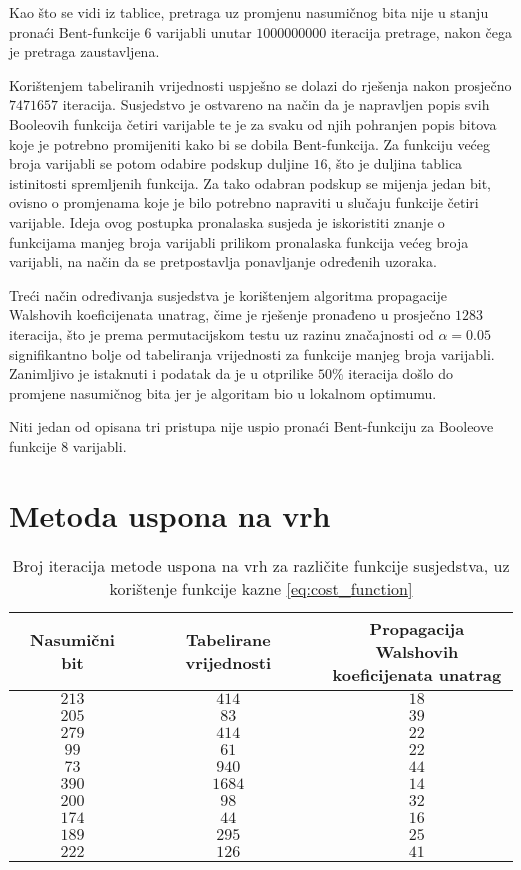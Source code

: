 Kao što se vidi iz tablice, pretraga uz promjenu nasumičnog bita nije u stanju pronaći Bent-funkcije $6$ varijabli unutar $1 000 000 000$ iteracija pretrage, nakon čega je pretraga zaustavljena.

Korištenjem tabeliranih vrijednosti uspješno se dolazi do rješenja nakon prosječno $7 471 657$ iteracija.
Susjedstvo je ostvareno na način da je napravljen popis svih Booleovih funkcija četiri varijable te je za svaku od njih pohranjen popis bitova koje je potrebno promijeniti kako bi se dobila Bent-funkcija.
Za funkciju većeg broja varijabli se potom odabire podskup duljine $16$, što je duljina tablica istinitosti spremljenih funkcija.
Za tako odabran podskup se mijenja jedan bit, ovisno o promjenama koje je bilo potrebno napraviti u slučaju funkcije četiri varijable.
Ideja ovog postupka pronalaska susjeda je iskoristiti znanje o funkcijama manjeg broja varijabli prilikom pronalaska funkcija većeg broja varijabli, na način da se pretpostavlja ponavljanje određenih uzoraka.

Treći način određivanja susjedstva je korištenjem algoritma propagacije Walshovih koeficijenata unatrag, čime je rješenje pronađeno u prosječno $1 283$ iteracija, što je prema permutacijskom testu uz razinu značajnosti od $\alpha = 0.05$ signifikantno bolje od tabeliranja vrijednosti za funkcije manjeg broja varijabli.
Zanimljivo je istaknuti i podatak da je u otprilike $50\%$ iteracija došlo do promjene nasumičnog bita jer je algoritam bio u lokalnom optimumu.

Niti jedan od opisana tri pristupa nije uspio pronaći Bent-funkciju za Booleove funkcije $8$ varijabli.

\section{Metoda uspona na vrh}
\begin{table}[]
    \centering
    \begin{tabular}{ccc}
        Nasumični bit & Tabelirane vrijednosti & \makecell{Propagacija Walshovih \\ koeficijenata unatrag} \\ \hline
        $213$ &   $414$ & $18$ \\
        $205$ &    $83$ & $39$ \\
        $279$ &   $414$ & $22$ \\
         $99$ &    $61$ & $22$ \\
         $73$ &   $940$ & $44$ \\
        $390$ & $1 684$ & $14$ \\
        $200$ &    $98$ & $32$ \\
        $174$ &    $44$ & $16$ \\
        $189$ &   $295$ & $25$ \\
        $222$ &   $126$ & $41$
    \end{tabular}
    \captionsetup{justification=centering}
    \caption{Broj iteracija metode uspona na vrh za različite funkcije susjedstva, uz korištenje funkcije kazne \eqref{eq:cost_function}}
    \label{tbl:greedy_6}
\end{table}

